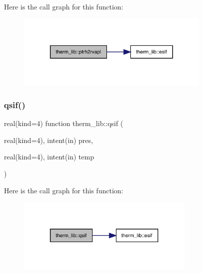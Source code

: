 Here is the call graph for this function\+:
\nopagebreak
\begin{figure}[H]
\begin{center}
\leavevmode
\includegraphics[width=264pt]{namespacetherm__lib_a31b5123d35b5fab2d91701e148b5ac1d_cgraph}
\end{center}
\end{figure}
\mbox{\label{namespacetherm__lib_a4c010ed765cc5d45d55e2fb76cb3ec89}} 
\subsubsection{\texorpdfstring{qsif()}{qsif()}}
{\footnotesize\ttfamily real(kind=4) function therm\+\_\+lib\+::qsif (\begin{DoxyParamCaption}\item[{real(kind=4), intent(in)}]{pres,  }\item[{real(kind=4), intent(in)}]{temp }\end{DoxyParamCaption})}

Here is the call graph for this function\+:
\nopagebreak
\begin{figure}[H]
\begin{center}
\leavevmode
\includegraphics[width=242pt]{namespacetherm__lib_a4c010ed765cc5d45d55e2fb76cb3ec89_cgraph}
\end{center}
\end{figure}
\mbox{\label{namespacetherm__lib_a383a9c98cdc308ddc74f774336a68c70}} 

